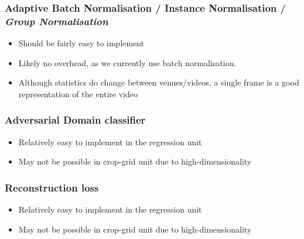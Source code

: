 \documentclass{report}
\begin{document}
\subsubsection{Adaptive Batch Normalisation / Instance Normalisation / \textit{Group Normalisation}}
\begin{itemize}
	\item Should be fairly easy to implement
	\item Likely no overhead, as we currently use batch normalisation.
	\item Although statistics do change between venues/videos, a single frame is a good representation of the entire video
\end{itemize}


\subsubsection{Adversarial Domain classifier}
\begin{itemize}
	\item Relatively easy to implement in the regression unit
	\item May not be possible in crop-grid unit due to high-dimensionality
\end{itemize}

\subsubsection{Reconstruction loss}
\begin{itemize}
	\item Relatively easy to implement in the regression unit
	\item May not be possible in crop-grid unit due to high-dimensionality
\end{itemize}

	
\end{document}
